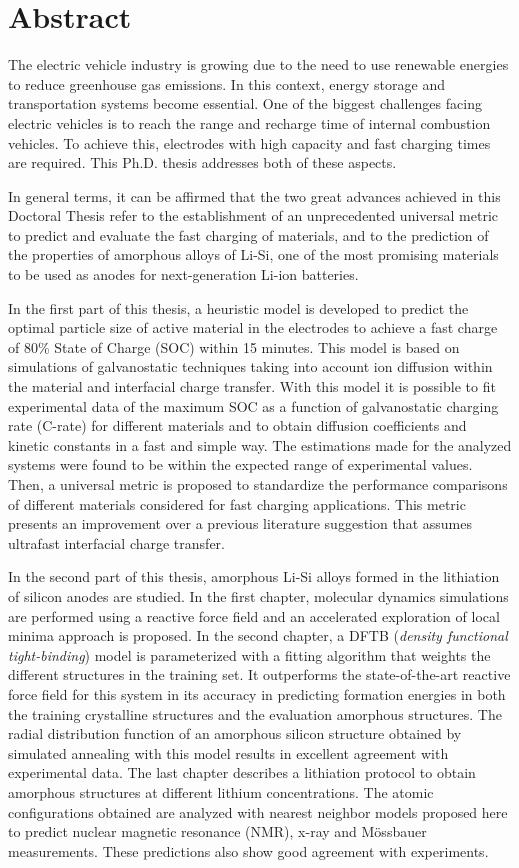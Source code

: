 \chapter{Abstract}

The electric vehicle industry is growing due to the need to use renewable 
energies to reduce greenhouse gas emissions. In this context, energy storage and 
transportation systems become essential. One of the biggest challenges facing 
electric vehicles is to reach the range and recharge time of internal combustion
vehicles. To achieve this, electrodes with high capacity and fast charging times 
are required. This Ph.D. thesis addresses both of these aspects.

In general terms, it can be affirmed that the two great advances achieved in this 
Doctoral Thesis refer to the establishment of an unprecedented universal metric 
to predict and evaluate the fast charging of materials, and to the prediction of 
the properties of amorphous alloys of Li-Si, one of the most promising materials
to be used as anodes for next-generation Li-ion batteries.

In the first part of this thesis, a heuristic model is developed to predict the 
optimal particle size of active material in the electrodes to achieve a fast 
charge of 80\% State of Charge (SOC) within 15 minutes. This model is based on 
simulations of galvanostatic techniques taking into account ion diffusion within 
the material and interfacial charge transfer. With this model it is possible to 
fit experimental data of the maximum SOC as a function of galvanostatic charging rate (C-rate) for different 
materials and to obtain diffusion coefficients and kinetic constants in a fast 
and simple way. The estimations made for the analyzed systems were found to be 
within the expected range of experimental values. Then, a universal metric is 
proposed to standardize the performance comparisons of different materials 
considered for fast charging applications. This metric presents an improvement 
over a previous literature suggestion that assumes ultrafast interfacial charge 
transfer.

In the second part of this thesis, amorphous Li-Si alloys formed in the 
lithiation of silicon anodes are studied. In the first chapter, molecular 
dynamics simulations are performed using a reactive force field and an accelerated 
exploration of local minima approach is proposed. In the second chapter, a DFTB 
(\textit{density functional tight-binding}) model is parameterized with a fitting 
algorithm that weights the different structures in the training set. It
outperforms the state-of-the-art reactive force field for this system in its 
accuracy in predicting formation energies in both the training crystalline 
structures and the evaluation amorphous structures. The radial distribution 
function of an amorphous silicon structure obtained by simulated annealing with 
this model results in excellent agreement with experimental data. The last 
chapter describes a lithiation protocol to obtain amorphous structures at 
different lithium concentrations. The atomic configurations obtained are analyzed 
with nearest neighbor models proposed here to predict nuclear magnetic resonance (NMR), x-ray and Mössbauer 
measurements. These predictions also show good agreement with experiments.
